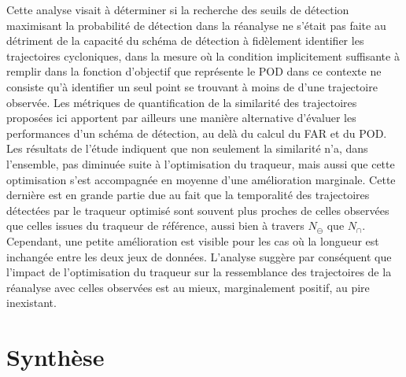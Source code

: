 \documentclass[../main.tex]{subfiles}
\begin{document}
Cette analyse visait à déterminer si la recherche des seuils de détection maximisant la probabilité de détection dans la réanalyse ne s'était pas faite au
détriment de la capacité du schéma de détection à fidèlement identifier les trajectoires cycloniques, dans la mesure où la condition implicitement suffisante à
remplir dans la fonction d'objectif que représente le POD dans ce contexte ne consiste qu'à identifier un seul point se trouvant à moins de  d'une
trajectoire observée. Les métriques de quantification de la similarité des trajectoires proposées ici apportent par ailleurs une manière alternative d'évaluer
les performances d'un schéma de détection, au delà du calcul du FAR et du POD. Les résultats de l'étude indiquent que non seulement la similarité n'a, dans
l'ensemble, pas diminuée suite à l'optimisation du traqueur, mais aussi que cette optimisation s'est accompagnée en moyenne d'une amélioration marginale. Cette
dernière est en grande partie due au fait que la temporalité des trajectoires détectées par le traqueur optimisé sont souvent plus proches de celles observées
que celles issues du traqueur de référence, aussi bien à travers $N_\ominus$ que $N_\cap$. Cependant, une petite amélioration est visible pour les cas où la
longueur est inchangée entre les deux jeux de données. L'analyse suggère par conséquent que l'impact de l'optimisation du traqueur sur la ressemblance des
trajectoires de la réanalyse avec celles observées est au mieux, marginalement positif, au pire inexistant.

\section{Synthèse}
\end{document}
